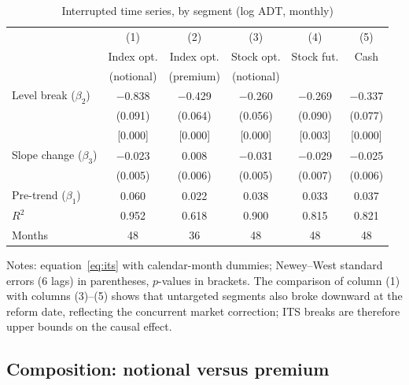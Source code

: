 \documentclass[12pt]{article}
\begin{document}
\begin{table}[H]
\centering
\caption{Interrupted time series, by segment (log ADT, monthly)}
\label{tab:its}
\small
\begin{threeparttable}
\begin{tabular}{lccccc}
\toprule
 & (1) & (2) & (3) & (4) & (5) \\
 & Index opt. & Index opt. & Stock opt. & Stock fut. & Cash \\
 & (notional) & (premium) & (notional) & & \\
\midrule
Level break ($\beta_2$) & $-$0.838 & $-$0.429 & $-$0.260 & $-$0.269 & $-$0.337 \\
 & (0.091) & (0.064) & (0.056) & (0.090) & (0.077) \\
 & [0.000] & [0.000] & [0.000] & [0.003] & [0.000] \\
Slope change ($\beta_3$) & $-$0.023 & 0.008 & $-$0.031 & $-$0.029 & $-$0.025 \\
 & (0.005) & (0.006) & (0.005) & (0.007) & (0.006) \\
Pre-trend ($\beta_1$) & 0.060 & 0.022 & 0.038 & 0.033 & 0.037 \\
$R^2$ & 0.952 & 0.618 & 0.900 & 0.815 & 0.821 \\
Months & 48 & 36 & 48 & 48 & 48 \\
\bottomrule
\end{tabular}
\begin{tablenotes}\footnotesize
\item Notes: equation~\eqref{eq:its} with calendar-month dummies;
Newey--West standard errors (6 lags) in parentheses, $p$-values in
brackets. The comparison of column (1) with columns (3)--(5) shows that
untargeted segments also broke downward at the reform date, reflecting
the concurrent market correction; ITS breaks are therefore upper bounds
on the causal effect.
\end{tablenotes}
\end{threeparttable}
\end{table}

\subsection{Composition: notional versus premium}\label{subsec:composition}
\end{document}
